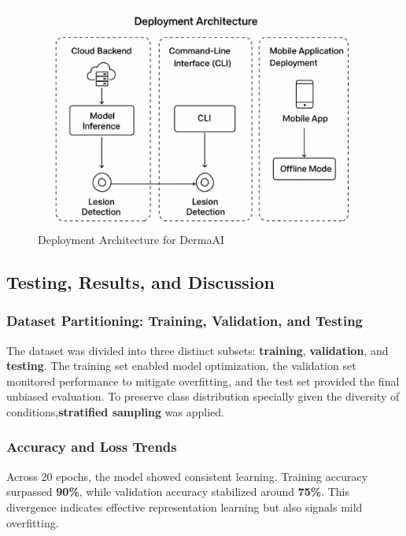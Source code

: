 \documentclass[
  12pt,
  oneside]{article}
\begin{document}
\begin{figure}

{\centering \includegraphics[width=0.7\linewidth]{deployement-architecture} 

}

\caption{Deployment Architecture for DermaAI}\label{fig:unnamed-chunk-18}
\end{figure}

\newpage

\subsection{Testing, Results, and
Discussion}\label{testing-results-and-discussion}

\subsubsection{Dataset Partitioning: Training, Validation, and
Testing}\label{dataset-partitioning-training-validation-and-testing}

The dataset was divided into three distinct subsets: \textbf{training},
\textbf{validation}, and \textbf{testing}. The training set enabled
model optimization, the validation set monitored performance to mitigate
overfitting, and the test set provided the final unbiased evaluation. To
preserve class distribution specially given the diversity of
conditions,\textbf{stratified sampling} was applied.

\subsubsection{Accuracy and Loss Trends}\label{accuracy-and-loss-trends}

Across 20 epochs, the model showed consistent learning. Training
accuracy surpassed \textbf{90\%}, while validation accuracy stabilized
around \textbf{75\%}. This divergence indicates effective representation
learning but also signals mild overfitting.
\end{document}

